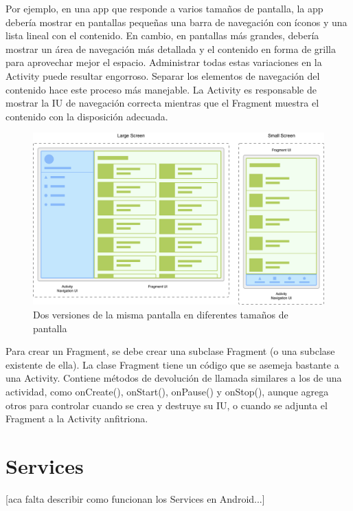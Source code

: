 Por ejemplo, en una app que responde a varios tamaños de pantalla, la app debería mostrar en pantallas pequeñas una barra de navegación con íconos y una lista lineal con el contenido. En cambio, en pantallas más grandes, debería mostrar un área de navegación más detallada y el contenido en forma de grilla para aprovechar mejor el espacio.
Administrar todas estas variaciones en la Activity puede resultar engorroso. Separar los elementos de navegación del contenido hace este proceso más manejable. La Activity es responsable de mostrar la IU de navegación correcta mientras que el Fragment muestra el contenido con la disposición adecuada.

\begin{figure}[H]
  \centering
    \includegraphics[scale=0.4]{04-framework/fragment-screen-sizes.png} 
   \caption{Dos versiones de la misma pantalla en diferentes tamaños de pantalla}
   \label{fig:umlFrameworkCore}
\end{figure}


Para crear un Fragment, se debe crear una subclase Fragment (o una subclase existente de ella). La clase Fragment tiene un código que se asemeja bastante a una Activity. Contiene métodos de devolución de llamada similares a los de una actividad, como onCreate(), onStart(), onPause() y onStop(), aunque agrega otros para controlar cuando se crea y destruye su IU, o cuando se adjunta el Fragment a la Activity anfitriona.
\cite{androidDocs}


\section{Services}
[aca falta describir como funcionan los Services en Android...]

